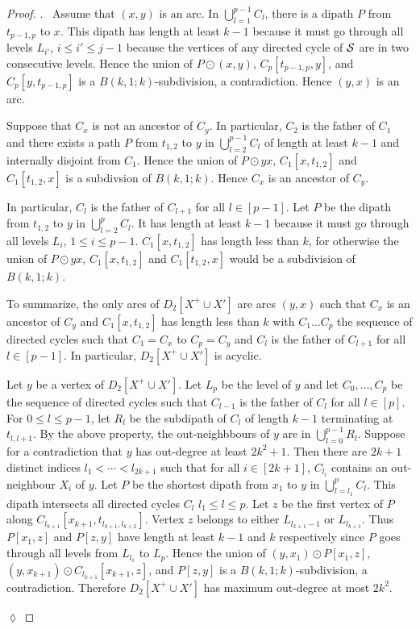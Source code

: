 \documentclass[utf8,10pt]{article}
\theoremstyle{plain}
\theoremstyle{definition}
\theoremstyle{remark}
\newenvironment{subproof}{\par\noindent {\it Subproof}.\ }{\hfill$\lozenge$\par\vspace{11pt}}
\begin{document}
\begin{proof}
\begin{subproof}
Assume that $(x,y)$ is an arc. In $\bigcup_{l=1}^{p-1} C_l$, there is a dipath $P$ from $t_{p-1,p}$ to $x$. This dipath has length at least $k-1$ because
it must go through all levels $L_{i'}$, $i\leq i'\leq j-1$ because the vertices of any directed cycle of ${\cal S}$ are in two consecutive levels.
Hence the union of $P\odot (x,y)$, $C_p[t_{p-1,p}, y]$, and  $C_p[y,t_{p-1,p}]$ is a $B(k,1;k)$-subdivision, a contradiction.
Hence  $(y,x)$ is an arc.


Suppose that $C_x$ is not an ancestor of $C_y$. In particular, $C_2$ is the father of $C_1$
and there exists a path $P$ from $t_{1,2}$ to $y$ in $\bigcup_{l=2}^{p-1} C_l$ of length at least $k-1$ and 
internally disjoint from $C_1$. Hence the union of $P \odot yx$, $C_1[x,t_{1,2}]$ and $C_1[t_{1,2},x]$ is a subdivsion of  $B(k,1;k)$.
Hence $C_x$ is an ancestor of $C_y$. 

In  particular, $C_l$ is the father of $C_{l+1}$ for all $l\in [p-1]$. Let $P$ be the dipath from $t_{1,2}$ 
to $y$ in $\bigcup_{l=2}^{p} C_l$. It has length at least $k-1$ because it must go through all levels $L_i$, $1\leq i\leq p-1$. 
$C_1[x,t_{1,2}]$ has length less than $k$, for otherwise the union of $P \odot yx$, $C_1[x,t_{1,2}]$ and $C_1[t_{1,2},x]$ would be a subdivision of  $B(k,1;k)$.

To summarize, the only arcs of $D_2[X^+\cup X']$ are arcs $(y,x)$ such that $C_x$ is an ancestor of $C_y$ and $C_1[x,t_{1,2}]$ has length less than $k$ with $C_1 \dots C_p$ the
sequence of directed cycles such that $C_1=C_x$ to $C_p=C_y$ and $C_l$ is the father of $C_{l+1}$ for all $l\in [p-1]$.
In particular, $D_2[X^+\cup X']$ is acyclic.

Let $y$ be a vertex of $D_2[X^+\cup X']$.
Let $L_p$ be the level of $y$ and let $C_0, \dots, C_p$ be the sequence of directed cycles such that $C_{l-1}$ is the father of $C_l$ for all $l\in [p]$.
For $0\leq l\leq p-1$, let $R_l$ be the subdipath of $C_l$ of length $k-1$ terminating at $t_{l,l+1}$. By the above property, the out-neighbbours of
$y$ are in $\bigcup_{l=0}^{p-1} R_l$.
Suppose for a contradiction that $y$ has out-degree at least $2k^2+1$. Then there are $2k+1$ distinct indices $l_1 < \cdots < l_{2k+1}$ such that for all $i\in [2k+1]$,  $C_{l_i}$ contains an out-neighbour $X_i$ of $y$.
Let $P$ be the shortest dipath from $x_1$ to $y$ in $\bigcup_{l=l_1}^p C_l$. This dipath intersects all directed cycles $C_l$ $l_1\leq l\leq p$. Let $z$ be the first vertex of $P$ along $C_{l_{k+1}}[x_{k+1}, t_{l_{k+1}, l_{k+2}}]$. Vertex $z$ belongs to either $L_{l_{k+1}-1}$ or $L_{l_{k+1}}$.
Thus $P[x_1, z]$ and $P[z, y]$ have length at least $k-1$ and $k$ respectively since $P$ goes through all levels from $L_{l_1}$ to $L_p$. 
 Hence the union of $(y, x_1) \odot P[x_1, z]$,  $(y,x_{k+1})\odot C_{l_{k+1}}[x_{k+1},z]$, and
$P[z, y]$ is a $B(k,1;k)$-subdivision, a contradiction.
Therefore $D_2[X^+\cup X']$ has maximum out-degree at most $2k^2$. 


\end{subproof}
\end{proof}
\end{document}
